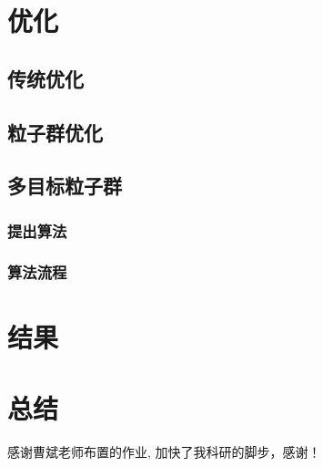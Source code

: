 \documentclass{HEBUTMaster}   %
\begin{document}
\chapter{优化}

\section{传统优化}

\section{粒子群优化}

\section{多目标粒子群}

\subsection{提出算法}

\subsection{算法流程}

\chapter{结果}

\chapter{总结}




\cleardoublepage{}
{}
\begin{thebibliography}{000}

  
\end{thebibliography}


\acknowledgement
感谢曹斌老师布置的作业, 加快了我科研的脚步，感谢！


\cleardoublepage
\end{document}
